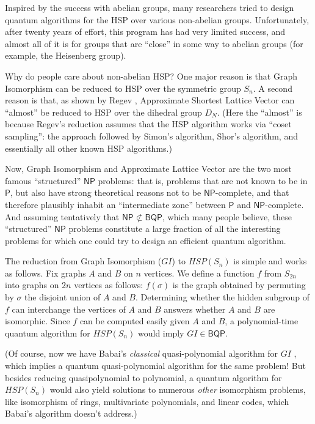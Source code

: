 \documentclass[12pt]{report}
\theoremstyle{plain}
\theoremstyle{definition}
\begin{document}
Inspired by the success with abelian groups, many researchers tried to design quantum algorithms for the HSP over various non-abelian groups. Unfortunately,
after twenty years of effort, this program has had very limited success, and almost all of it is for groups that are ``close'' in some way to abelian groups (for example, the Heisenberg group).

Why do people care about non-abelian HSP?  One major reason is that Graph Isomorphism can be reduced to HSP over the symmetric group $S_n$.
 A second reason is that, as shown by Regev \cite{Regev04}, Approximate Shortest Lattice Vector
 can ``almost'' be reduced to HSP over the dihedral group $D_N$. (Here the ``almost'' is because Regev's reduction assumes that the HSP algorithm works via ``coset sampling'': the approach followed by Simon's algorithm, Shor's algorithm, and essentially all other known HSP algorithms.)

Now, Graph Isomorphism and Approximate Lattice Vector are the two most famous ``structured'' $\mathsf{NP}$ problems: that is, problems that are not known to be in $\mathsf{P}$, but also have strong theoretical reasons not to be $\mathsf{NP}$-complete, and that therefore plausibly inhabit an ``intermediate zone'' between $\mathsf{P}$ and $\mathsf{NP}$-complete. And assuming tentatively that $\mathsf{NP} \not\subset \mathsf{BQP}$, which many people believe, these ``structured'' $\mathsf{NP}$ problems constitute a large fraction of all the interesting problems for which one could try to design an efficient quantum algorithm.

The reduction from Graph Isomorphism ($GI$) to $HSP(S_n)$ is  simple and works as follows. Fix graphs $A$ and $B$
on $n$ vertices. We define a function $f$ from  $S_{2n}$ into graphs on $2n$ vertices as follows: $f(\sigma)$ is the graph obtained by permuting by $\sigma$ the disjoint union of
$A$ and $B$. Determining whether the hidden subgroup of $f$ can interchange the vertices of $A$ and $B$ answers whether $A$ and $B$
are isomorphic. Since $f$ can be computed easily given $A$ and $B$, a polynomial-time quantum algorithm for $HSP(S_n)$ would imply $GI\in \mathsf{BQP}$.

(Of course, now we have Babai's {\em classical} quasi-polynomial algorithm for $GI$ \cite{Babai16}, which implies a quantum quasi-polynomial algorithm for the same problem!  But besides reducing quasipolynomial to polynomial, a quantum algorithm for $HSP(S_n)$ would also yield solutions to numerous {\em other} isomorphism problems, like isomorphism of rings, multivariate polynomials, and linear codes, which Babai's algorithm doesn't address.)
\end{document}
